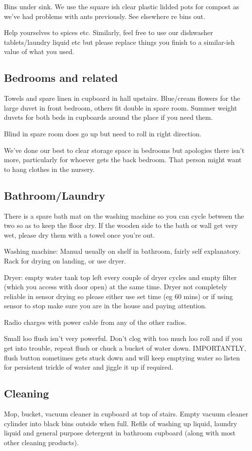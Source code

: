 \documentclass[11pt]{article}
\begin{document}
Bins under sink.  We use the square ish clear plastic lidded pots for compost as we've had problems with ants previously.  See elsewhere re bins out.  

Help yourselves to spices etc.  Similarly, feel free to use our dishwasher tablets/laundry liquid etc but please replace things you finish to a similar-ish value of what you used.
\subsection{Bedrooms and related} 
Towels and spare linen in cupboard in hall upstairs.  Blue/cream flowers for the large duvet in front bedroom, others fit double in spare room.  Summer weight duvets for both beds in cupboards around the place if you need them.  

Blind in spare room does go up but need to roll in right direction. 

We've done our best to clear storage space in bedrooms but apologies there isn't more, particularly for whoever gets the back bedroom. That person might want to hang clothes in the nursery.   

 
\subsection*{Bathroom/Laundry}
There is a spare bath mat on the washing machine so you can cycle between the two so as to keep the floor dry.  If the wooden side to the bath or wall get very wet, please dry them with a towel once you're out.  

Washing machine: Manual usually on shelf in bathroom, fairly self explanatory.  Rack for drying on landing, or use dryer.  

Dryer: empty water tank top left every couple of dryer cycles and empty filter (which you access with door open) at the same time.  Dryer not completely reliable in sensor drying so please either use set time (eg 60 mins) or if using sensor to stop make sure you are in the house and paying attention.  

Radio charges with power cable from any of the other radios.  

Small loo flush isn't very powerful.  Don't clog with too much loo roll and if you get into trouble, repeat flush or chuck a bucket of water down.  IMPORTANTLY, flush button sometimes gets stuck down and will keep emptying water so listen for persistent trickle of water and jiggle it up if required.  


\subsection*{Cleaning}
Mop, bucket, vacuum cleaner in cupboard at top of stairs. Empty vacuum cleaner cylinder into black bins outside when full.  Refils of washing up liquid, laundry liquid and general purpose detergent in bathroom cupboard (along with most other cleaning products).  
\end{document}
